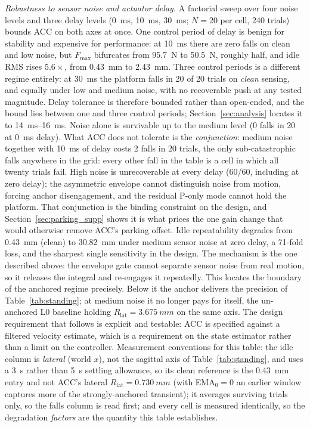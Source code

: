 \documentclass[a4paper,fleqn]{cas-dc}
\begin{document}
\emph{Robustness to sensor noise and actuator delay.}
A factorial sweep over four noise levels and three delay levels (\SI{0}{ms}, \SI{10}{ms}, \SI{30}{ms}; $N{=}20$ per cell, \num{240} trials) bounds ACC on both axes at once.
One control period of delay is benign for stability and expensive for performance: at \SI{10}{ms} there are zero falls on clean and low noise, but $F_{\max}$ bifurcates from \SI{95.7}{N} to \SI{50.5}{N}, roughly half, and idle RMS rises $5.6{\times}$, from \SI{0.43}{mm} to \SI{2.43}{mm}. Three control periods is a different regime entirely: at \SI{30}{ms} the platform falls in \num{20} of \num{20} trials on \emph{clean} sensing, and equally under low and medium noise, with no recoverable push at any tested magnitude. Delay tolerance is therefore bounded rather than open-ended, and the bound lies between one and three control periods; Section~\ref{sec:analysis} locates it to \SIrange{14}{16}{ms}.
Noise alone is survivable up to the medium level (\num{0} falls in \num{20} at \SI{0}{ms} delay).
What ACC does not tolerate is the \emph{conjunction}: medium noise together with \SI{10}{ms} of delay costs \num{2} falls in \num{20} trials, the only sub-catastrophic falls anywhere in the grid: every other fall in the table is a cell in which all twenty trials fail. High noise is unrecoverable at every delay (\num{60}/\num{60}, including at zero delay); the asymmetric envelope cannot distinguish noise from motion, forcing anchor disengagement, and the residual P-only mode cannot hold the platform.
That conjunction is the binding constraint on the design, and Section~\ref{sec:parking_supp} shows it is what prices the one gain change that would otherwise remove ACC's parking offset.
Idle repeatability degrades from \SI{0.43}{mm} (clean) to \SI{30.82}{mm} under medium sensor noise at zero delay, a \num{71}-fold loss, and the sharpest single sensitivity in the design. The mechanism is the one described above: the envelope gate cannot separate sensor noise from real motion, so it releases the integral and re-engages it repeatedly. This locates the boundary of the anchored regime precisely. Below it the anchor delivers the precision of Table~\ref{tab:standing}; at medium noise it no longer pays for itself, the un-anchored L0 baseline holding $R_{\text{lat}}=\SI{3.675}{mm}$ on the same axis. The design requirement that follows is explicit and testable: ACC is specified against a filtered velocity estimate, which is a requirement on the state estimator rather than a limit on the controller. Measurement conventions for this table: the idle column is \emph{lateral} (world $x$), not the sagittal axis of Table~\ref{tab:standing}, and uses a \SI{3}{s} rather than \SI{5}{s} settling allowance, so its clean reference is the \SI{0.43}{mm} entry and not ACC's lateral $R_{\text{lat}}=\SI{0.730}{mm}$ (with EMA$_0{=}0$ an earlier window captures more of the strongly-anchored transient); it averages surviving trials only, so the falls column is read first; and every cell is measured identically, so the degradation \emph{factors} are the quantity this table establishes.
\end{document}
